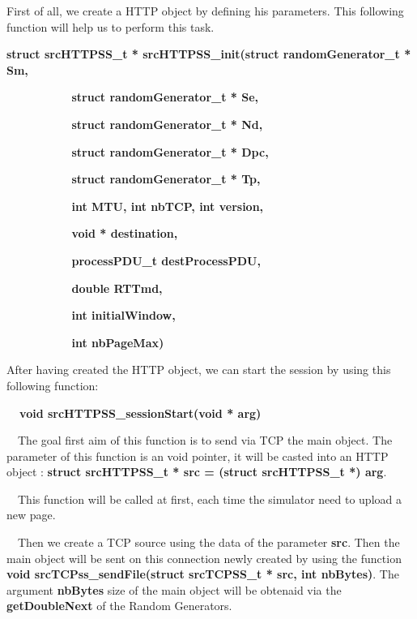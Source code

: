 \documentclass[a4paper]{article}
\begin{document}
\bigskip

{
First of all, we create a HTTP object by defining his parameters. This
following function will help us to perform this task.}

{\bfseries
struct srcHTTPSS\_t * srcHTTPSS\_init(struct randomGenerator\_t * Sm,}

{\bfseries
\ \ \ \ \ \ \ \ \ \ struct randomGenerator\_t * Se,}

{\bfseries
\ \ \ \ \ \ \ \ \ \ struct randomGenerator\_t * Nd,}

{\bfseries
\ \ \ \ \ \ \ \ \ \ struct randomGenerator\_t * Dpc,}

{\bfseries
\ \ \ \ \ \ \ \ \ \ struct randomGenerator\_t * Tp,}

{\bfseries
\ \ \ \ \ \ \ \ \ \ int MTU, int nbTCP, int version,}

{\bfseries
\ \ \ \ \ \ \ \ \ \ void * destination,}

{\bfseries
\ \ \ \ \ \ \ \ \ \ processPDU\_t destProcessPDU,}

{\bfseries
\ \ \ \ \ \ \ \ \ \ double RTTmd,}

{\bfseries
\ \ \ \ \ \ \ \ \ \ int initialWindow,}

{\bfseries
\ \ \ \ \ \ \ \ \ \ int nbPageMax)}


\bigskip

{
After having created the HTTP object, we can start the session by using
this following function:}

{\bfseries
\ \ void srcHTTPSS\_sessionStart(void * arg)}

{
\ \ The goal first aim of this function is to send via TCP the main
object. The parameter of this function is an void pointer, it will be
casted into an HTTP object : \textbf{struct srcHTTPSS\_t * src =
(struct srcHTTPSS\_t *) arg}.}

{
\ \ This function will be called at first, each time the simulator need
to upload a new page.}


\bigskip

{
\ \ Then we create a TCP source using the data of the parameter
\textbf{src}. Then the main object will be sent on this connection
newly created by using the function \textbf{void
srcTCPss\_sendFile(struct srcTCPSS\_t * src, int nbBytes)}. The
argument \textbf{nbBytes }size of the main object will be obtenaid via
the \textbf{getDoubleNext }of the Random Generators.}
\end{document}
